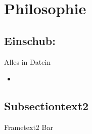 \section[ph]{Philosophie}
\subsection{Einschub: }
\begin{frame}{Alles in Datein}
\begin{itemize}
 \item 
\end{itemize}

\end{frame}

\subsection{Subsectiontext2}
\begin{frame}{Frametext2}
Bar
\end{frame}